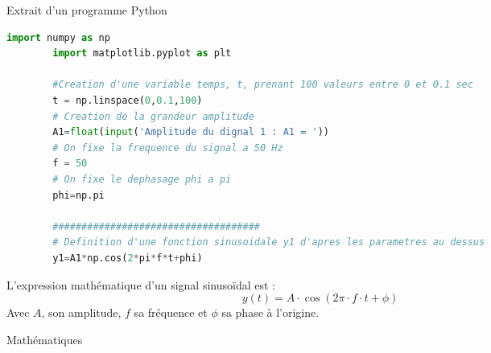 \documentclass[a4paper,11pt,fleqn]{article}%
\begin{document}
\begin{figure}[h!]
    \begin{minipage}{.7\linewidth}
        \caption{Extrait d'un programme Python}
    \begin{lstlisting}[language=Python]
        import numpy as np
        import matplotlib.pyplot as plt

        #Creation d'une variable temps, t, prenant 100 valeurs entre 0 et 0.1 sec
        t = np.linspace(0,0.1,100)
        # Creation de la grandeur amplitude
        A1=float(input('Amplitude du dignal 1 : A1 = '))
        # On fixe la frequence du signal a 50 Hz
        f = 50
        # On fixe le dephasage phi a pi
        phi=np.pi

        ####################################
        # Definition d'une fonction sinusoidale y1 d'apres les parametres au dessus
        y1=A1*np.cos(2*pi*f*t+phi)
    \end{lstlisting}
    \label{doc2}
    \end{minipage}\hspace{.02\linewidth}
    \begin{minipage}{.28\linewidth}
        \caption{Mathématiques}
        L'expression mathématique d'un signal sinusoïdal est : $$y(t)=A \cdot \cos(2\pi \cdot f \cdot t + \phi) $$
        Avec $A$, son amplitude, $f$ sa fréquence et $\phi$ sa phase à l'origine.
    \end{minipage}
\end{figure}
\end{document}
